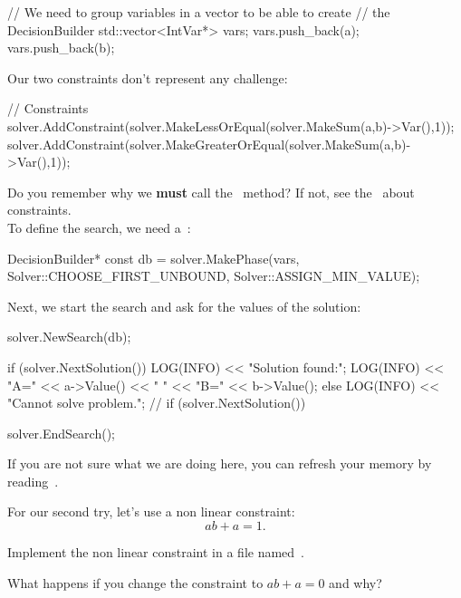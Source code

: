 \documentclass[]{article}
\begin{document}
\begin{exercise}
\begin{cppcode}
  // We need to group variables in a vector to be able to create
  // the DecisionBuilder
  std::vector<IntVar*> vars;
  vars.push_back(a);
  vars.push_back(b);
\end{cppcode}

Our two constraints don't represent any challenge:

\begin{cppcode}
  // Constraints
  solver.AddConstraint(solver.MakeLessOrEqual(solver.MakeSum(a,b)->Var(),1));
  solver.AddConstraint(solver.MakeGreaterOrEqual(solver.MakeSum(a,b)->Var(),1));
\end{cppcode}

Do you remember why we {\bf must} call the~ method? If not, see
the~ about constraints.\\

To define the search, we need a~:

\begin{cppcode}
  DecisionBuilder* const db = solver.MakePhase(vars,
                                               Solver::CHOOSE_FIRST_UNBOUND,
                                               Solver::ASSIGN_MIN_VALUE);
\end{cppcode}

Next, we start the search and ask for the values of the solution:

\begin{cppcode}
  solver.NewSearch(db);

  if (solver.NextSolution()) {
    LOG(INFO) << "Solution found:";
    LOG(INFO) << "A=" << a->Value() << " " << "B=" << b->Value();
  } else {
    LOG(INFO) << "Cannot solve problem.";
  }  // if (solver.NextSolution())

  solver.EndSearch();
\end{cppcode}

If you are not sure what we are doing here, you can refresh your memory
by reading~.
\end{exercise}

For our second try, let's use a non linear constraint:
\[ ab + a = 1.\]

\begin{exercise}
Implement the non linear constraint in a file named~.
\end{exercise}

\begin{exercise}[\difficultyOne]
What happens if you change the constraint to $ab + a = 0$ and why?
\end{exercise}
\vspace{-1cm}
\end{document}
